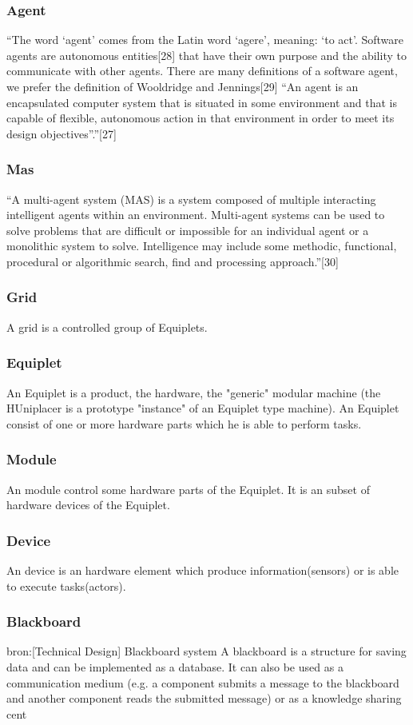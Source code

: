 \documentclass[12pt,a4paper]{report}
\begin{document}
\subsubsection{Agent}
“The word ‘agent’ comes from the Latin word ‘agere’, meaning: ‘to act’. Software agents are autonomous entities[28] that have their own purpose and the ability to communicate with other agents. There are many definitions of a software agent, we prefer the definition of Wooldridge and Jennings[29] “An agent is an encapsulated computer system that is situated in some environment and that is capable of flexible, autonomous action in that environment in
order to meet its design objectives”.”[27]
\subsubsection{Mas}
“A multi-agent system (MAS) is a system composed of multiple interacting intelligent agents within an environment. Multi-agent systems can be used to solve problems that are difficult or impossible for an individual agent or a monolithic system to solve. Intelligence may include some methodic, functional, procedural or algorithmic search, find and processing approach.”[30]
\subsubsection{Grid}
A grid is a controlled group of Equiplets.
\subsubsection{Equiplet}
An Equiplet is a product, the hardware, the "generic" modular machine (the HUniplacer is a prototype "instance" of an Equiplet type machine). An Equiplet consist of one or more hardware parts which he is able to perform tasks.
\subsubsection{Module}
An module control some hardware parts of the Equiplet. It is an subset of hardware devices of the Equiplet.
\subsubsection{Device}
An device is an hardware element which produce information(sensors) or is able to execute tasks(actors).
\subsubsection{Blackboard}
bron:[Technical Design] Blackboard system
A blackboard is a structure for saving data and can be implemented as a database. It can also be used as a communication medium (e.g. a component submits a message to the blackboard and another component reads the submitted message) or as a knowledge sharing cent



\end{document}
